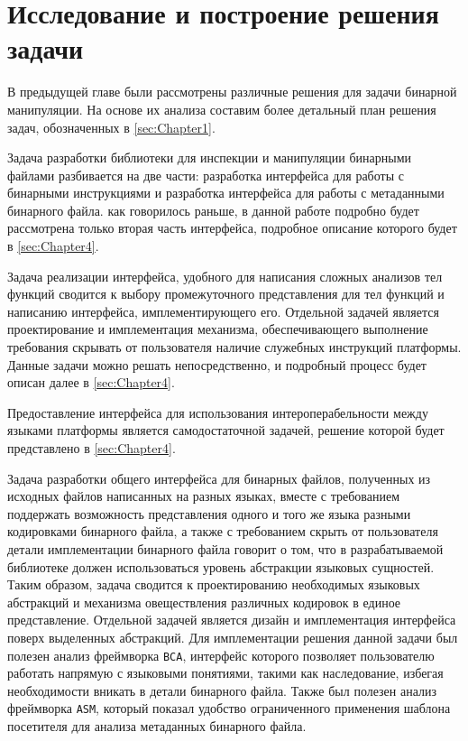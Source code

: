 \section{Исследование и построение решения задачи}
\label{sec:Chapter3} 

\sloppy

В предыдущей главе были рассмотрены различные решения для задачи бинарной манипуляции. На основе их анализа составим более детальный план решения задач, обозначенных в \autoref{sec:Chapter1}.

Задача разработки библиотеки для инспекции и манипуляции бинарными файлами разбивается на две части: разработка интерфейса для работы с бинарными инструкциями и разработка интерфейса для работы с метаданными бинарного файла. как говорилось раньше, в данной работе подробно будет рассмотрена только вторая часть интерфейса, подробное описание которого будет в \autoref{sec:Chapter4}.

Задача реализации интерфейса, удобного для написания сложных анализов тел функций сводится к выбору промежуточного представления для тел функций и написанию интерфейса, имплементирующего его. Отдельной задачей является проектирование и имплементация механизма, обеспечивающего выполнение требования скрывать от пользователя наличие служебных инструкций платформы. Данные задачи можно решать непосредственно, и подробный процесс будет описан далее в \autoref{sec:Chapter4}.

Предоставление интерфейса для использования интероперабельности между языками платформы является самодостаточной задачей, решение которой будет представлено в \autoref{sec:Chapter4}.

Задача разработки общего интерфейса для бинарных файлов, полученных из исходных файлов написанных на разных языках, вместе с требованием поддержать возможность представления одного и того же языка разными кодировками бинарного файла, а также с требованием скрыть от пользователя детали имплементации бинарного файла говорит о том, что в разрабатываемой библиотеке должен использоваться уровень абстракции языковых сущностей. Таким образом, задача сводится к проектированию необходимых языковых абстракций и механизма овеществления различных кодировок в единое представление. Отдельной задачей является дизайн и имплементация интерфейса поверх выделенных абстракций. Для имплементации решения данной задачи был полезен анализ фреймворка \texttt{BCA}, интерфейс которого позволяет пользователю работать напрямую с языковыми понятиями, такими как наследование, избегая необходимости вникать в детали бинарного файла. Также был полезен анализ фреймворка \texttt{ASM}, который показал удобство ограниченного применения шаблона посетителя для анализа метаданных бинарного файла.

\newpage

